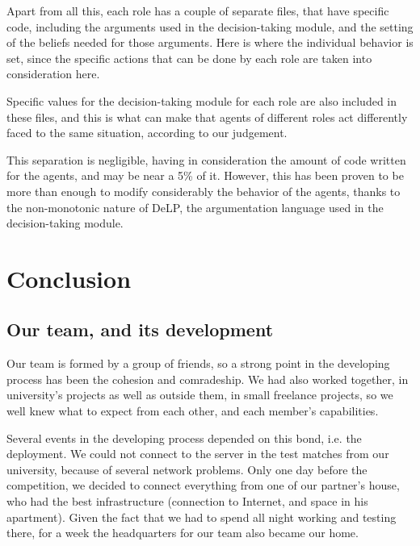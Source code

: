 \documentclass{llncs2e/llncs}
\begin{document}
    Apart from all this, each role has a couple of separate files, that have 
    specific code, including the arguments used in the decision-taking module, and
    the setting of the beliefs needed for those arguments. Here is where the 
    individual behavior is set, since the specific actions that can be done by each
    role are taken into consideration here.
    
    Specific values for the decision-taking module for each role are also included
    in these files, and this is what can make that agents of different roles act 
    differently faced to the same situation, according to our judgement.
    
    This separation is negligible, having in consideration the amount of code 
    written for the agents, and may be near a 5\% of it. However, this has been proven to
    be more than enough to modify considerably the behavior of the agents, thanks to
    the non-monotonic nature of DeLP, the argumentation language used in the 
    decision-taking module.


\section{Conclusion}




\subsection{Our team, and its development}
    

    Our team is formed by a group of friends, so a strong point in the developing 
    process has been the cohesion and comradeship. We had also worked together,
    in university's projects as well as outside them, in small freelance 
    projects, so we well knew what to expect from each other, and each member's 
    capabilities. 

    Several events in the developing process depended on this bond, i.e. the 
    deployment. We could not connect to the server in the test matches from our 
    university, because of several network problems. Only one day before 
    the competition, we decided to connect everything from one of our partner's house, 
    who had the best infrastructure (connection to Internet, and space in his 
    apartment). Given the fact that we had to spend all night working and testing
    there, for a week the headquarters for our team also became our home.
\end{document}
